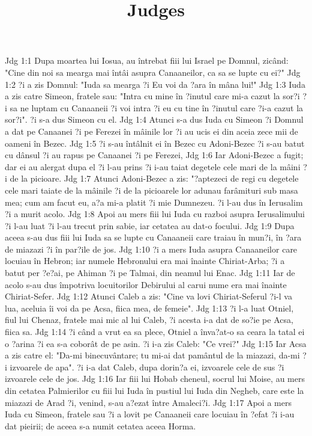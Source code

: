 

\title{Judges}

Jdg 1:1  Dupa moartea lui Iosua, au întrebat fiii lui Israel pe Domnul, zicând: "Cine din noi sa mearga mai întâi asupra Canaaneilor, ca sa se lupte cu ei?"
Jdg 1:2  ?i a zis Domnul: "Iuda sa mearga ?i Eu voi da ?ara în mâna lui!"
Jdg 1:3  Iuda a zis catre Simeon, fratele sau: "Intra cu mine în ?inutul care mi-a cazut la sor?i ?i sa ne luptam cu Canaaneii ?i voi intra ?i eu cu tine în ?inutul care ?i-a cazut la sor?i". ?i s-a dus Simeon cu el.
Jdg 1:4  Atunci s-a dus Iuda cu Simeon ?i Domnul a dat pe Canaanei ?i pe Ferezei în mâinile lor ?i au ucis ei din aceia zece mii de oameni în Bezec.
Jdg 1:5  ?i s-au întâlnit ei în Bezec cu Adoni-Bezec ?i s-au batut cu dânsul ?i au rapus pe Canaanei ?i pe Ferezei,
Jdg 1:6  Iar Adoni-Bezec a fugit; dar ei au alergat dupa el ?i l-au prins ?i i-au taiat degetele cele mari de la mâini ?i de la picioare.
Jdg 1:7  Atunci Adoni-Bezec a zis: "?aptezeci de regi cu degetele cele mari taiate de la mâinile ?i de la picioarele lor adunau farâmituri sub masa mea; cum am facut eu, a?a mi-a platit ?i mie Dumnezeu. ?i l-au dus în Ierusalim ?i a murit acolo.
Jdg 1:8  Apoi au mers fiii lui Iuda cu razboi asupra Ierusalimului ?i l-au luat ?i l-au trecut prin sabie, iar cetatea au dat-o focului.
Jdg 1:9  Dupa aceea s-au dus fiii lui Iuda sa se lupte cu Canaaneii care traiau în mun?i, în ?ara de miazazi ?i în par?ile de jos.
Jdg 1:10  ?i a mers Iuda asupra Canaaneilor care locuiau în Hebron; iar numele Hebronului era mai înainte Chiriat-Arba; ?i a batut per ?e?ai, pe Ahiman ?i pe Talmai, din neamul lui Enac.
Jdg 1:11  Iar de acolo s-au dus împotriva locuitorilor Debirului al carui nume era mai înainte Chiriat-Sefer.
Jdg 1:12  Atunci Caleb a zis: "Cine va lovi Chiriat-Seferul ?i-l va lua, aceluia îi voi da pe Acsa, fiica mea, de femeie".
Jdg 1:13  ?i l-a luat Otniel, fiul lui Chenaz, fratele mai mic al lui Caleb, ?i acesta i-a dat de so?ie pe Acsa, fiica sa.
Jdg 1:14  ?i când a vrut ea sa plece, Otniel a înva?at-o sa ceara la tatal ei o ?arina ?i ea s-a coborât de pe asin. ?i i-a zis Caleb: "Ce vrei?"
Jdg 1:15  Iar Acsa a zis catre el: "Da-mi binecuvântare; tu mi-ai dat pamântul de la miazazi, da-mi ?i izvoarele de apa". ?i i-a dat Caleb, dupa dorin?a ei, izvoarele cele de sus ?i izvoarele cele de jos.
Jdg 1:16  Iar fiii lui Hobab cheneul, socrul lui Moise, au mers din cetatea Palmierilor cu fiii lui Iuda în pustiul lui Iuda din Negheb, care este la miazazi de Arad ?i, venind, s-au a?ezat între Amaleci?i.
Jdg 1:17  Apoi a mers Iuda cu Simeon, fratele sau ?i a lovit pe Canaaneii care locuiau în ?efat ?i i-au dat pieirii; de aceea s-a numit cetatea aceea Horma.
